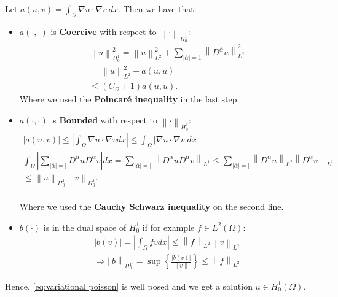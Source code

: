 \documentclass[../Main/main.tex]{subfiles}
\begin{document}
	\begin{example}
		Let $a(u,v) = \int_{\Omega}\nabla u \cdot \nabla v \ dx$. Then we have that:
		\begin{itemize}
			\item $a(\cdot,\cdot)$ is \textbf{Coercive} with respect to $\left \| \cdot \right \|_{H_0^1}$:
			\begin{equation*}
				\begin{gathered}
					\left \| u \right \|^2_{H_0^1} = \left \| u \right \|^2_{L^2} + \sum_{|\overline{\alpha}|=1} \left \| D^{\overline{\alpha}} u \right \|^2_{L^2}\\
					=\left \|u\right \|^2_{L^2} + a(u,u) \\
					\leq (C_{\Omega} + 1)a(u,u).
				\end{gathered}
			\end{equation*}
			Where we used the \textbf{Poincaré inequality} in the last step.
			\item $a(\cdot,\cdot)$ is \textbf{Bounded} with respect to $\left \| \cdot \right \|_{H_0^1}$:
			\begin{equation*}
				\begin{gathered}
					|a(u,v)|\leq \left |\int_{\Omega}\nabla u \cdot \nabla v dx \right | \leq \int_{\Omega} |\nabla u \cdot \nabla v| dx \\
					\int_{\Omega} |\sum_{|\overline{\alpha}|=|}D^{\overline{\alpha}}u D^{\overline{\alpha}}v|dx=\sum_{|\overline{\alpha}|=|} \left \| D^{\overline{\alpha}}u D^{\overline{\alpha}}v \right \|_{L^1} \leq \sum_{|\overline{\alpha}|=|} \left \| D^{\overline{\alpha}}u \right \|_{L^2} \left \| D^{\overline{\alpha}}v \right \|_{L^2} \\
					\leq \left \|u \right \|_{H_0^1} \left \| v \right \|_{H_0^1}.
				\end{gathered}
			\end{equation*}\\
		Where we used the \textbf{Cauchy Schwarz inequality} on the second line.
		\item  $b(\cdot)$ is in the dual space of $H_0^1$ if for example $f\in L^2(\Omega)$:
		\begin{equation*}
			\begin{gathered}
				|b(v)| = |\int_{\Omega} fv dx | \leq \left \|f \right \|_{L^2} \left \| v \right \|_{L^2} \\
				\Rightarrow \left |\ b \right \|_{H_0^{1'}} = \sup\left \{ \frac{|b(v)|}{\left \| v \right \|} \right \} \leq \left \| f \right \|_{L^2}
			\end{gathered}
		\end{equation*}
		\end{itemize}
		Hence, \eqref{eq:variational poisson} is well posed and we get a solution $u \in H_0^1(\Omega)$.
	\end{example}
\end{document}
